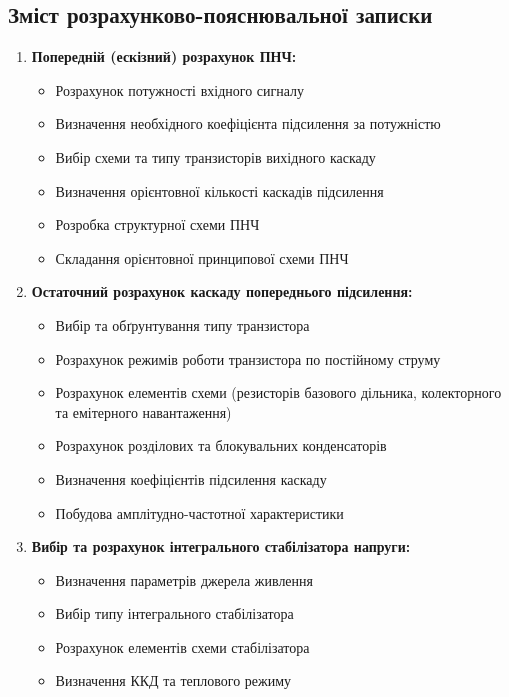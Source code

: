 \documentclass[main.tex]{subfiles}
\begin{document}
\subsection{Зміст розрахунково-пояснювальної записки}
\begin{enumerate}
    \item \textbf{Попередній (ескізний) розрахунок ПНЧ:}
    \begin{itemize}
        \item Розрахунок потужності вхідного сигналу
        \item Визначення необхідного коефіцієнта підсилення за потужністю
        \item Вибір схеми та типу транзисторів вихідного каскаду
        \item Визначення орієнтовної кількості каскадів підсилення
        \item Розробка структурної схеми ПНЧ
        \item Складання орієнтовної принципової схеми ПНЧ
    \end{itemize}
    
    \item \textbf{Остаточний розрахунок каскаду попереднього підсилення:}
    \begin{itemize}
        \item Вибір та обґрунтування типу транзистора
        \item Розрахунок режимів роботи транзистора по постійному струму
        \item Розрахунок елементів схеми (резисторів базового дільника, колекторного та емітерного навантаження)
        \item Розрахунок розділових та блокувальних конденсаторів
        \item Визначення коефіцієнтів підсилення каскаду
        \item Побудова амплітудно-частотної характеристики
    \end{itemize}
    
    \item \textbf{Вибір та розрахунок інтегрального стабілізатора напруги:}
    \begin{itemize}
        \item Визначення параметрів джерела живлення
        \item Вибір типу інтегрального стабілізатора
        \item Розрахунок елементів схеми стабілізатора
        \item Визначення ККД та теплового режиму
    \end{itemize}
\end{enumerate}
\end{document}

